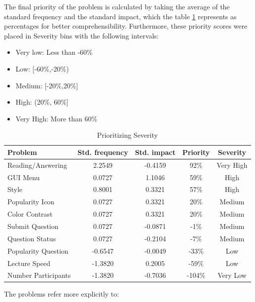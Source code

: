 \documentclass{article}
\begin{document}
The final priority of the problem is calculated by taking the average of the standard frequency and the standard impact, 
which the table \ref{scores} represents as percentages for better comprehensibility. Furthermore, these priority scores were placed in Severity bins
with the following intervals:

\begin{itemize}
    \item Very low: Less than -60\%
    \item Low: [-60\%,-20\%)
    \item Medium: [-20\%,20\%]
    \item High: (20\%, 60\%]
    \item Very High: More than 60\%
\end{itemize}

\begin{table}[ht]
    \centering
    \begin{tabular}{||l c c c c ||} 
     \hline
     Problem & Std. frequency & Std. impact & Priority & Severity \\
     \hline\hline
     Reading/Answering & 2.2549 & -0.4159 & 92\% & Very High\\
     GUI Menu & 0.0727 & 1.1046 & 59\% & High\\
     Style & 0.8001 & 0.3321 & 57\% & High\\
     Popularity Icon & 0.0727 & 0.3321 & 20\% & Medium\\
     Color Contrast & 0.0727 & 0.3321 & 20\% & Medium\\
     Submit Question & 0.0727 & -0.0871 & -1\% & Medium\\
     Question Status & 0.0727 & -0.2104 & -7\% & Medium\\
     Popularity Question & -0.6547 & -0.0049 & -33\% & Low\\
     Lecture Speed & -1.3820 & 0.2005 & -59\% & Low\\
     Number Participants & -1.3820 & -0.7036 & -104\% & Very Low\\
     \hline
    \end{tabular}
    \caption{Prioritizing Severity}
    \label{scores}
    \end{table}

The problems refer more explicitly to:
\end{document}

